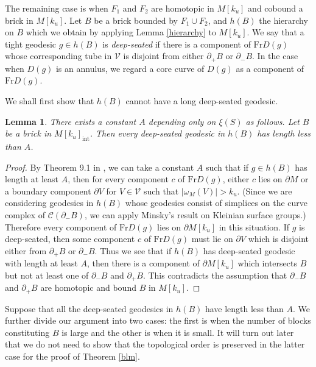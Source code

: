 \documentclass{amsart}
\newtheorem{lemma}[theorem]{Lemma}
\theoremstyle{definition}
\numberwithin{figure}{section}
\numberwithin{equation}{section}
\newcommand{\blackboard}[1]{\ensuremath{\mathbb{#1}}}
\newcommand{\complexes}{\blackboard{C}}
\newcommand{\Fr}{\mathrm{Fr}}
\def\cc{\complexes}
\def\cc{\mathcal{C}}
\def\cv{\mathcal{V}}
\begin{document}
The remaining case is when $F_1$ and $F_2$ are homotopic in $M[k_u]$ and cobound a brick in $M[k_u]$.
Let $B$ be a brick bounded by $F_1 \cup F_2$, and $h(B)$ the hierarchy on $B$ which we obtain by applying  Lemma \ref{hierarchy} to $M[k_u]$.
We say that a tight geodesic $g \in h(B)$ is {\em deep-seated} if there is a component of $\Fr D(g)$ whose corresponding tube in $\cv$ is disjoint from either $\partial_+B$ or $\partial_-B$.
In the case when $D(g)$ is an annulus, we regard a core curve of $D(g)$ as a component of $\Fr D(g)$.

We shall first show that $h(B)$ cannot have a long deep-seated geodesic.

\begin{lemma}
\label{no long deep-seated}
There exists a constant  $A$ depending only on $\xi(S)$ as follows.
Let $B$ be a brick in $M[k_u]_\mathrm{int}$.
Then every deep-seated geodesic in $h(B)$ has length less than $A$.
\end{lemma}
\begin{proof}
By Theorem 9.1 in \cite{mi2}, we can take a constant $A$ such that if $g \in h(B)$ has length at least $A$, then for every component $c$ of $\Fr D(g)$, either $c$ lies on $\partial M$ or a boundary component $\partial V$ for $V \in \cv$ such that  $|\omega_M(V)|> k_u$.
(Since we are considering geodesics in $h(B)$ whose geodesics consist of simplices on the curve complex of $\cc(\partial_-B)$, we can apply Minsky's result on  Kleinian surface groups.)
Therefore every component of $\Fr D(g)$ lies on $\partial M[k_u]$ in this situation.
If  $g$ is deep-seated, then some component $c$ of  $\Fr D(g)$ must lie on $\partial V$ which is disjoint either from $\partial_+B$ or $\partial_- B$.
Thus we see that if $h(B)$ has deep-seated geodesic with length at least $A$, then there is a component of $\partial M[k_u]$ which intersects $B$ but not at least one of $\partial_-B$ and $\partial_+B$.
This contradicts the assumption that $\partial_-B$ and $\partial_+B$ are homotopic and bound $B$ in $M[k_u]$.
\end{proof}




Suppose that all the deep-seated geodesics in $h(B)$ have length less than $A$.
We further divide our argument into two cases: the first is when the number of blocks constituting $B$ is large and the other is when it is small.
It will turn out later that we do not need to show that the topological order is preserved in the latter case for the proof of Theorem \ref{blm}.
\end{document}
